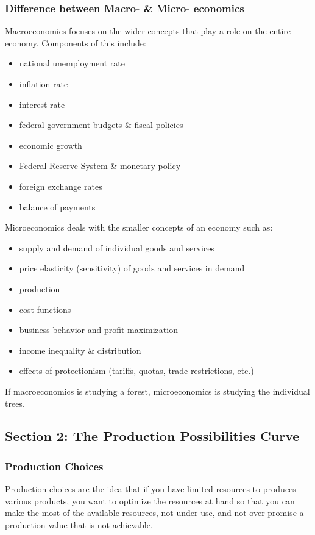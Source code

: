 \documentclass[a4paper, 12pt] {article}
\begin{document}
\subsubsection{Difference between Macro- \& Micro- economics}
Macroeconomics focuses on the wider concepts that play a role on the entire
economy. Components of this include:
\begin{itemize}
    \item national unemployment rate
    \item inflation rate
    \item interest rate
    \item federal government budgets \& fiscal policies
    \item economic growth
    \item Federal Reserve System \& monetary policy
    \item foreign exchange rates
    \item balance of payments
\end{itemize}
Microeconomics deals with the smaller concepts of an economy such as:
\begin{itemize}
    \item supply and demand of individual goods and services
    \item price elasticity (sensitivity) of goods and services in demand
    \item production
    \item cost functions
    \item business behavior and profit maximization
    \item income inequality \& distribution
    \item effects of protectionism (tariffs, quotas, trade restrictions, etc.)
\end{itemize}
If macroeconomics is studying a forest, microeconomics is studying the
individual trees.

\subsection{Section 2: The Production Possibilities Curve}
\subsubsection{Production Choices}
Production choices are the idea that if you have limited resources to produces
various products, you want to optimize the resources at hand so that you can make
the most of the available resources, not under-use, and not over-promise a production
value that is not achievable.
\end{document}
